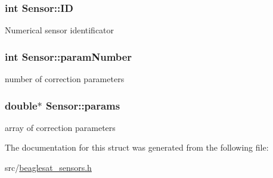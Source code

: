 \subsubsection[{I\+D}]{\setlength{\rightskip}{0pt plus 5cm}int Sensor\+::\+I\+D}\label{structSensor_abc79ffcb2e0783e2f6000c011c65fb07}
Numerical sensor identificator \hypertarget{structSensor_ada1a837f41f7db788c26375b801b616d}{}
\subsubsection[{param\+Number}]{\setlength{\rightskip}{0pt plus 5cm}int Sensor\+::param\+Number}\label{structSensor_ada1a837f41f7db788c26375b801b616d}
number of correction parameters \hypertarget{structSensor_a5c7e519f5a64497c0e2e1144a1729211}{}
\subsubsection[{params}]{\setlength{\rightskip}{0pt plus 5cm}double$\ast$ Sensor\+::params}\label{structSensor_a5c7e519f5a64497c0e2e1144a1729211}
array of correction parameters 

The documentation for this struct was generated from the following file\+:\begin{DoxyCompactItemize}
\item 
src/\hyperlink{beaglesat__sensors_8h}{beaglesat\+\_\+sensors.\+h}\end{DoxyCompactItemize}
